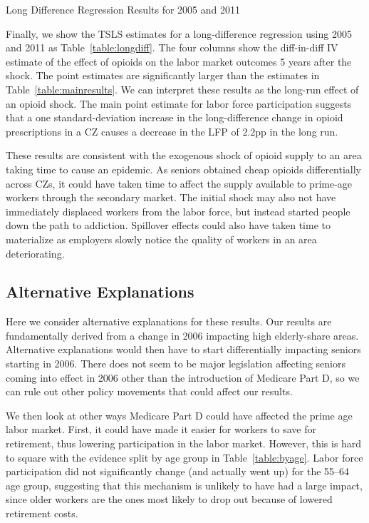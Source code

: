 \documentclass[12pt]{article}
\begin{document}
\begin{table}
    \footnotesize
    \centering
    \caption{Long Difference Regression Results for 2005 and 2011}
    
    \label{table:longdiff}
\end{table}

Finally, we show the TSLS estimates for a long-difference regression using 2005 and 2011 as Table~\ref{table:longdiff}.  The four columns show the diff-in-diff IV estimate of the effect of opioids on the labor market outcomes 5 years after the shock.  The point estimates are significantly larger than the estimates in Table~\ref{table:mainresults}.  We can interpret these results as the long-run effect of an opioid shock.  The main point estimate for labor force participation suggests that a one standard-deviation increase in the long-difference change in opioid prescriptions in a CZ causes a decrease in the LFP of $2.2$pp in the long run.

These results are consistent with the exogenous shock of opioid supply to an area taking time to cause an epidemic.  As seniors obtained cheap opioids differentially across CZs, it could have taken time to affect the supply available to prime-age workers through the secondary market.  The initial shock may also not have immediately displaced workers from the labor force, but instead started people down the path to addiction.  Spillover effects could also have taken time to materialize as employers slowly notice the quality of workers in an area deteriorating.

\subsection{Alternative Explanations}
Here we consider alternative explanations for these results.  Our results are fundamentally derived from a change in 2006 impacting high elderly-share areas.  Alternative explanations would then have to start differentially impacting seniors starting in 2006.  There does not seem to be major legislation affecting seniors coming into effect in 2006 other than the introduction of Medicare Part D, so we can rule out other policy movements that could affect our results.

We then look at other ways Medicare Part D could have affected the prime age labor market.  First, it could have made it easier for workers to save for retirement, thus lowering participation in the labor market.  However, this is hard to square with the evidence split by age group in Table~\ref{table:byage}.  Labor force participation did not significantly change (and actually went up) for the 55--64 age group, suggesting that this mechanism is unlikely to have had a large impact, since older workers are the ones most likely to drop out because of lowered retirement costs.
\end{document}
